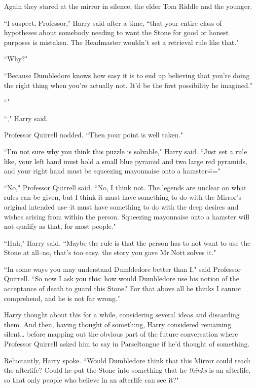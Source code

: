 Again they stared at the mirror in silence, the elder Tom Riddle and the younger.

``I suspect, Professor," Harry said after a time, ``that your entire class of hypotheses about somebody needing to want the Stone for good or honest purposes is mistaken. The Headmaster wouldn't set a retrieval rule like that."

``Why?"

``Because Dumbledore knows how easy it is to end up believing that you're doing the right thing when you're actually not. It'd be the first possibility he imagined."

``"

``," Harry said.

Professor Quirrell nodded. ``Then your point is well taken."

``I'm not sure why you think this puzzle is solvable," Harry said. ``Just set a rule like, your left hand must hold a small blue pyramid and two large red pyramids, and your right hand must be squeezing mayonnaise onto a hamster\==="

``No," Professor Quirrell said. ``No, I think not. The legends are unclear on what rules can be given, but I think it must have something to do with the Mirror's original intended use\---it must have something to do with the deep desires and wishes arising from within the person. Squeezing mayonnaise onto a hamster will not qualify as that, for most people."

``Huh," Harry said. ``Maybe the rule is that the person has to not want to use the Stone at all\---no, that's too easy, the story you gave Mr.\?Nott solves it."

``In some ways you may understand Dumbledore better than I," said Professor Quirrell. ``So now I ask you this: how would Dumbledore use his notion of the acceptance of death to guard this Stone? For that above all he thinks I cannot comprehend, and he is not far wrong."

Harry thought about this for a while, considering several ideas and discarding them. And then, having thought of something, Harry considered remaining silent{\ldots} before mapping out the obvious part of the future conversation where Professor Quirrell asked him to say in Parseltongue if he'd thought of something.

Reluctantly, Harry spoke. ``Would Dumbledore think that this Mirror could reach the afterlife? Could he put the Stone into something that he \emph{thinks} is an afterlife, so that only people who believe in an afterlife can see it?"

